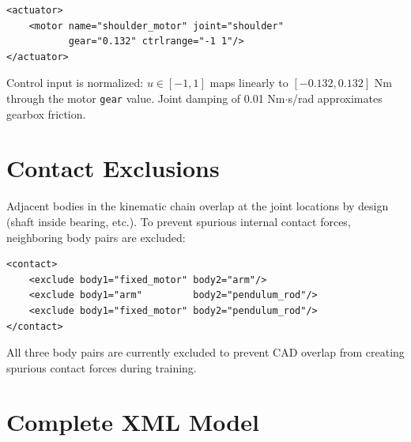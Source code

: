 \documentclass[12pt,a4paper]{article}
\begin{document}
\begin{lstlisting}[style=xml]
<actuator>
    <motor name="shoulder_motor" joint="shoulder"
           gear="0.132" ctrlrange="-1 1"/>
</actuator>
\end{lstlisting}

\noindent Control input is normalized: $u \in [-1, 1]$ maps linearly to
$[-0.132, 0.132]$ Nm through the motor \texttt{gear} value.
Joint damping of 0.01 Nm$\cdot$s/rad approximates gearbox friction.

\section{Contact Exclusions}

Adjacent bodies in the kinematic chain overlap at the joint locations by design (shaft inside bearing, etc.).
To prevent spurious internal contact forces, neighboring body pairs are excluded:

\begin{lstlisting}[style=xml]
<contact>
    <exclude body1="fixed_motor" body2="arm"/>
    <exclude body1="arm"         body2="pendulum_rod"/>
    <exclude body1="fixed_motor" body2="pendulum_rod"/>
</contact>
\end{lstlisting}

\noindent All three body pairs are currently excluded to prevent CAD overlap
from creating spurious contact forces during training.

\section{Complete XML Model}
\end{document}
